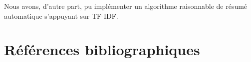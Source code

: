 \documentclass[a4paper, 12pt]{article}
\begin{document}
Nous avons, d'autre part, pu implémenter un algorithme raisonnable de résumé automatique s'appuyant sur TF-IDF. %



\vspace{1\baselineskip}










 

\section{Références bibliographiques}
\end{document}
